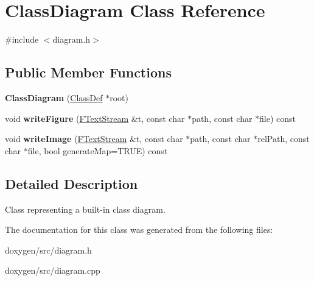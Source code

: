 \hypertarget{class_class_diagram}{}\section{Class\+Diagram Class Reference}
\label{class_class_diagram}


{\ttfamily \#include $<$diagram.\+h$>$}

\subsection*{Public Member Functions}
\begin{DoxyCompactItemize}
\item 
\mbox{\label{class_class_diagram_abc61e6f209f3e4474a4b4dc7aedaa77d}} 
{\bfseries Class\+Diagram} (\mbox{\hyperlink{class_class_def}{Class\+Def}} $\ast$root)
\item 
\mbox{\label{class_class_diagram_af11336309ad17bda63126dc5c4f50a04}} 
void {\bfseries write\+Figure} (\mbox{\hyperlink{class_f_text_stream}{F\+Text\+Stream}} \&t, const char $\ast$path, const char $\ast$file) const
\item 
\mbox{\label{class_class_diagram_a809189c0f835bfb62cac23db7d454b2d}} 
void {\bfseries write\+Image} (\mbox{\hyperlink{class_f_text_stream}{F\+Text\+Stream}} \&t, const char $\ast$path, const char $\ast$rel\+Path, const char $\ast$file, bool generate\+Map=T\+R\+UE) const
\end{DoxyCompactItemize}


\subsection{Detailed Description}
Class representing a built-\/in class diagram. 

The documentation for this class was generated from the following files\+:\begin{DoxyCompactItemize}
\item 
doxygen/src/diagram.\+h\item 
doxygen/src/diagram.\+cpp\end{DoxyCompactItemize}
